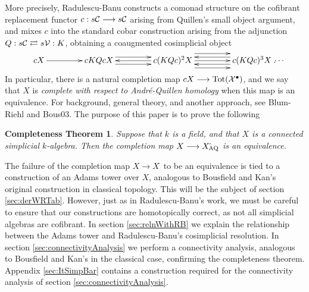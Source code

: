 \documentclass[11pt]{amsart}
\theoremstyle{plain}
\newtheorem*{completenesstheorem}{Completeness Theorem}
\begin{document}
More precisely, Radulescu-Banu constructs a comonad structure on the cofibrant replacement functor $c:s\calC\to s\calC$ arising from Quillen's small object argument, and mixes $c$ into the standard cobar construction arising from the adjunction $Q:s\calC\rightleftarrows s\calV:K$, obtaining a coaugmented cosimplicial object 
\[
\vcenter{
\def\labelstyle{\scriptstyle}
\xymatrix@C=1.5cm@1{
cX\,
\ar[r]
&
\,cKQcX\,
\ar[r];[]
&
\,c(KQc)^2X\,
\ar@<-1ex>[l];[]
\ar@<+1ex>[l];[]
\ar@<+1ex>[r];[]
\ar@<-1ex>[r];[]
&
\,c(KQc)^3X\,\makebox[0cm][l]{\,$\cdots $}
\ar[l];[]
\ar@<-2ex>[l];[]
\ar@<+2ex>[l];[]
}}.\]
In particular, there is a natural completion map $cX\to\textup{Tot}(\calX^\bullet)$, and we say that $X$ is \emph{complete with respect to Andr\'e-Quillen homology} when this map is an equivalence.
For background, general theory, and another approach, see Blum-Riehl and Bous03. The purpose of this paper is to prove the following
\begin{completenesstheorem}\label{completenesstheorem}
Suppose that $k$ is a field, and that $X$ is a connected simplicial $k$-algebra. Then the completion map $X\to X{\hat{\,}_\textup{\!\!AQ}}$ is an equivalence.
\end{completenesstheorem}
The failure of the completion map $X\to X^{\hat\,}$ to be an equivalence is tied to a construction of an Adams tower over $X$, analogous to Bousfield and Kan's original construction in classical topology. This will be the subject of section \ref{sec:derWRTab}. However, just as in Radulescu-Banu's work, we must be careful to ensure that our constructions are homotopically correct, as not all simplicial algebras are cofibrant. In section \ref{sec:relnWithRB} we explain the relationship between the Adams tower and Radulescu-Banu's cosimplicial resolution. In section \ref{sec:connectivityAnalysis} we perform a connectivity analysis, analogous to Bousfield and Kan's in the classical case, confirming the completeness theorem. Appendix \ref{sec:ItSimpBar} contains a construction required for the connectivity analysis of section \ref{sec:connectivityAnalysis}.
\end{document}
